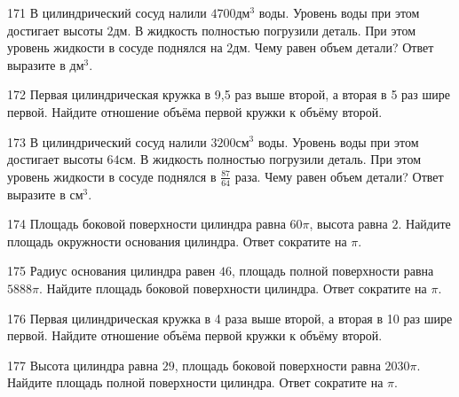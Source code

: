 \documentclass[4apaper]{article}
\begin{document}
\begin{taskBN}{171}
В цилиндрический сосуд налили $4700\mbox{дм}^3$ воды. Уровень воды при этом достигает высоты $2$дм. В жидкость полностью погрузили деталь. При этом уровень жидкости в сосуде поднялся на $2$дм. Чему равен объем детали? Ответ выразите в $\mbox{дм}^3$.
\end{taskBN}

\begin{taskBN}{172}
 Первая цилиндрическая кружка в 9,5 раз выше второй, а вторая в 5 раз шире первой. Найдите отношение объёма первой кружки к объёму второй.
\end{taskBN}

\begin{taskBN}{173}
В цилиндрический сосуд налили $3200\mbox{см}^3$ воды. Уровень воды при этом достигает высоты $64$см. В жидкость полностью погрузили деталь. При этом уровень жидкости в сосуде поднялся в $\frac{87}{64}$ раза. Чему равен объем детали? Ответ выразите в $\mbox{см}^3$.
\end{taskBN}

\begin{taskBN}{174}
Площадь боковой поверхности цилиндра равна $60\pi$, высота равна $2$. Найдите площадь окружности основания цилиндра. Ответ сократите на $\pi$.
\end{taskBN}

\begin{taskBN}{175}
Радиус основания цилиндра равен $46$, площадь полной поверхности равна $5888\pi$. Найдите площадь боковой поверхности цилиндра. Ответ сократите на $\pi$.
\end{taskBN}

\begin{taskBN}{176}
 Первая цилиндрическая кружка в 4 раза выше второй, а вторая в 10 раз шире первой. Найдите отношение объёма первой кружки к объёму второй.
\end{taskBN}

\begin{taskBN}{177}
Высота цилиндра равна $29$, площадь боковой поверхности равна $2030\pi$. Найдите площадь полной поверхности цилиндра. Ответ сократите на $\pi$.
\end{taskBN}
\end{document}
